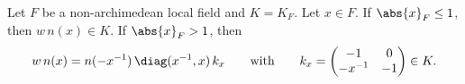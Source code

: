 Let $F$ be a non-archimedean local field and $K=K_F$. Let $x\in F$. If $\abs{x}_F\le1$, then $w\,n(x)\in K$. If
$\abs{x}_F>1$, then
\[
  w\,n(x)=n(-x^{-1})\,\diag(x^{-1},x)\,k_x\qquad\text{with}\qquad
  k_x=\begin{pmatrix}-1&0\\-x^{-1}&-1\end{pmatrix}\in K.
\]
